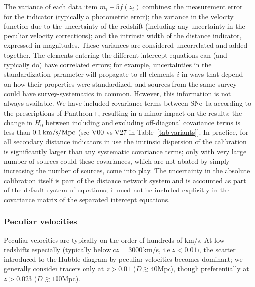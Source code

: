 The variance of each data item $m_i - 5 f(z_i)$ combines: the measurement error for the indicator (typically a photometric error); the variance in the velocity function due to the uncertainty of the redshift (including any uncertainty in the peculiar velocity corrections); and the intrinsic width of the distance indicator, expressed in magnitudes.  These variances are considered uncorrelated and added together. The elements entering the different intercept equations can (and typically do) have correlated errors; for example, uncertainties in the standardization parameter will propagate to all elements $i$ in ways that depend on how their properties were standardized, and sources from the same survey could have survey-systematics in common. However, this information is not always available. We have included covariance terms between SNe~Ia according to the prescriptions of Pantheon+, resulting in a minor impact on the results; the change in $ H_0 $ between including and excluding off-diagonal covariance terms is less than $ 0.1 \, \rm km/s/Mpc $ (see V00 vs V27 in Table~\ref{tab:variants}). In practice, for all secondary distance indicators in use the intrinsic dispersion of the calibration is significantly larger than any systematic covariance terms; only with very large number of sources could these covariances, which are not abated by simply increasing the number of sources, come into play. The uncertainty in the absolute calibration itself is part of the distance network system and is accounted as part of the default system of equations; it need not be included explicitly in the covariance matrix of the separated intercept equations.

\subsubsection{Peculiar velocities}\label{app:sec:pec_vel}

Peculiar velocities are typically on the order of hundreds of km/s. At low redshifts especially (typically below $cz=3000$\,km/s, i.e $z<0.01$), the scatter introduced to the Hubble diagram by peculiar velocities becomes dominant; we generally consider tracers only at $ z > 0.01 $ ($D \gtrsim 40$Mpc), though preferentially at $z>0.023$ ($D \gtrsim 100$Mpc).
 
